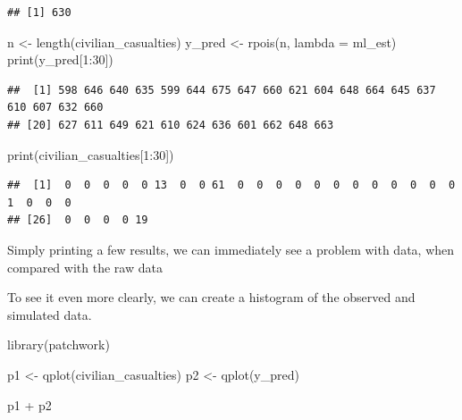 \documentclass[
]{book}
\newenvironment{Shaded}{\begin{snugshade}}{\end{snugshade}}
\newcommand{\AttributeTok}[1]{\textcolor[rgb]{0.77,0.63,0.00}{#1}}
\newcommand{\DecValTok}[1]{\textcolor[rgb]{0.00,0.00,0.81}{#1}}
\newcommand{\FunctionTok}[1]{\textcolor[rgb]{0.00,0.00,0.00}{#1}}
\newcommand{\NormalTok}[1]{#1}
\newcommand{\OtherTok}[1]{\textcolor[rgb]{0.56,0.35,0.01}{#1}}
\newcommand{\SpecialCharTok}[1]{\textcolor[rgb]{0.00,0.00,0.00}{#1}}
\begin{document}
\begin{verbatim}
## [1] 630
\end{verbatim}

\begin{Shaded}
\begin{Highlighting}[]
\NormalTok{n }\OtherTok{\textless{}{-}} \FunctionTok{length}\NormalTok{(civilian\_casualties)}
\NormalTok{y\_pred }\OtherTok{\textless{}{-}} \FunctionTok{rpois}\NormalTok{(n, }\AttributeTok{lambda =}\NormalTok{ ml\_est)}
\FunctionTok{print}\NormalTok{(y\_pred[}\DecValTok{1}\SpecialCharTok{:}\DecValTok{30}\NormalTok{])}
\end{Highlighting}
\end{Shaded}

\begin{verbatim}
##  [1] 598 646 640 635 599 644 675 647 660 621 604 648 664 645 637 610 607 632 660
## [20] 627 611 649 621 610 624 636 601 662 648 663
\end{verbatim}

\begin{Shaded}
\begin{Highlighting}[]
\FunctionTok{print}\NormalTok{(civilian\_casualties[}\DecValTok{1}\SpecialCharTok{:}\DecValTok{30}\NormalTok{])}
\end{Highlighting}
\end{Shaded}

\begin{verbatim}
##  [1]  0  0  0  0  0 13  0  0 61  0  0  0  0  0  0  0  0  0  0  0  0  1  0  0  0
## [26]  0  0  0  0 19
\end{verbatim}

Simply printing a few results, we can immediately see a problem with data, when compared with the raw data

To see it even more clearly, we can create a histogram of the observed and simulated data.

\begin{Shaded}
\begin{Highlighting}[]
\FunctionTok{library}\NormalTok{(patchwork)}

\NormalTok{p1 }\OtherTok{\textless{}{-}} \FunctionTok{qplot}\NormalTok{(civilian\_casualties)}
\NormalTok{p2 }\OtherTok{\textless{}{-}} \FunctionTok{qplot}\NormalTok{(y\_pred)}

\NormalTok{p1 }\SpecialCharTok{+}\NormalTok{ p2}
\end{Highlighting}
\end{Shaded}
\end{document}
